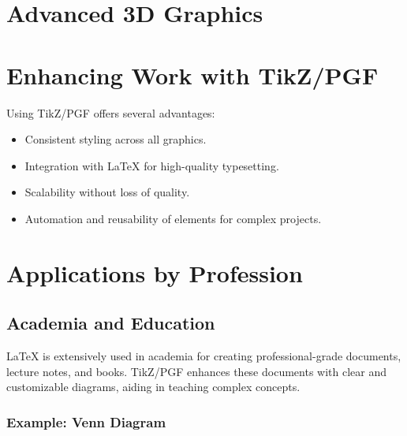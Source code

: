 \documentclass{article}
\begin{document}
\section{Advanced 3D Graphics}

\section{Enhancing Work with TikZ/PGF}
Using TikZ/PGF offers several advantages:
\begin{itemize}
    \item Consistent styling across all graphics.
    \item Integration with LaTeX for high-quality typesetting.
    \item Scalability without loss of quality.
    \item Automation and reusability of elements for complex projects.
\end{itemize}

\section{Applications by Profession}

\subsection{Academia and Education}
LaTeX is extensively used in academia for creating professional-grade documents, lecture notes, and books. TikZ/PGF enhances these documents with clear and customizable diagrams, aiding in teaching complex concepts.

\subsubsection*{Example: Venn Diagram}
\end{document}
